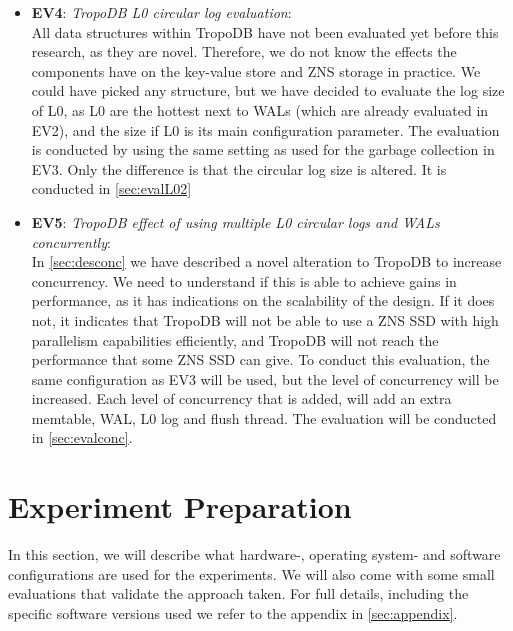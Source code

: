 \begin{itemize}
    \item \textbf{EV4}: \textit{TropoDB L0 circular log evaluation}:\\
    All data structures within TropoDB have not been evaluated yet before this research, as they are novel. Therefore, we do not know the effects the components have on the key-value store and ZNS storage in practice. We could have picked any structure, but we have decided to evaluate the log size of L0, as L0 are the hottest next to WALs (which are already evaluated in EV2), and the size if L0 is its main configuration parameter. The evaluation is conducted by using the same setting as used for the garbage collection in EV3. Only the difference is that the circular log size is altered. It is conducted in \autoref{sec:evalL02}
    \item \textbf{EV5}: \textit{TropoDB effect of using multiple L0 circular logs and WALs concurrently}:\\
    In \autoref{sec:desconc} we have described a novel alteration to TropoDB to increase concurrency. We need to understand if this is able to achieve gains in performance, as it has indications on the scalability of the design. If it does not, it indicates that TropoDB will not be able to use a ZNS SSD with high parallelism capabilities efficiently, and TropoDB will not reach the performance that some ZNS SSD can give. To conduct this evaluation, the same configuration as EV3 will be used, but the level of concurrency will be increased. Each level of concurrency that is added, will add an extra memtable, WAL, L0 log and flush thread. The evaluation will be conducted in \autoref{sec:evalconc}.
\end{itemize}

\section{Experiment Preparation}
\label{sec:experimentpreparation}
In this section, we will describe what hardware-, operating system- and software configurations are used for the experiments. We will also come with some small evaluations that validate the approach taken. For full details, including the specific software versions used we refer to the appendix in \autoref{sec:appendix}.

